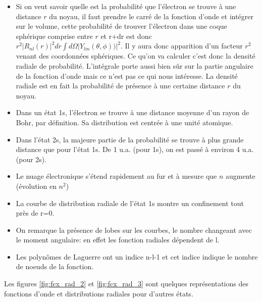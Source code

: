\begin{itemize}[label=$\bullet$]
    \item Si on veut savoir quelle est la probabilité que l'électron se trouve à une distance $r$ du noyau, il faut prendre le carré de la fonction d'onde et intégrer sur le volume, cette probabilité de trouver l'électron dans une coque sphérique comprise entre $r$ et r+dr est donc $r^2|R_{nl}(r)|^2dr\int d\Omega |Y_{lm}(\theta,\phi))|^2$. Il y aura donc apparition d'un facteur $r^2$ venant des coordonnées sphériques. Ce qu'on va calculer c'est donc la densité radiale de probabilité. L'intégrale porte aussi bien sûr sur la partie angulaire de la fonction d'onde mais ce n'est pas ce qui nous intéresse. La densité radiale est en fait la probabilité de présence à une certaine distance $r$ du noyau. 
    \item Dans un état 1s, l'électron se trouve à une distance moyenne d'un rayon de Bohr, par définition. Sa distribution est centrée à une unité atomique.
    \item Dans l'état 2s, la majeure partie de la probabilité se trouve à plus grande distance que pour l'état 1s. De 1 u.a. (pour 1s), on est passé à environ 4 u.a. (pour 2s). 
    \item Le nuage électronique s'étend rapidement au fur et à mesure que $n$ augmente (évolution en $n^2$)
    \item La courbe de distribution radiale de l'état 1s montre un confinement tout près de r=0. 
    \item On remarque la présence de lobes sur les courbes, le nombre changeant avec le moment angulaire: en effet les fonction radiales dépendent de l. 
    \item Les polynômes de Laguerre ont un indice n-l-1 et cet indice indique le nombre de noeuds de la fonction. 
\end{itemize}

Les figures \ref{fig:fcx_rad_2} et \ref{fig:fcx_rad_3} sont quelques représentations des fonctions d'onde et distributions radiales pour d'autres états.

